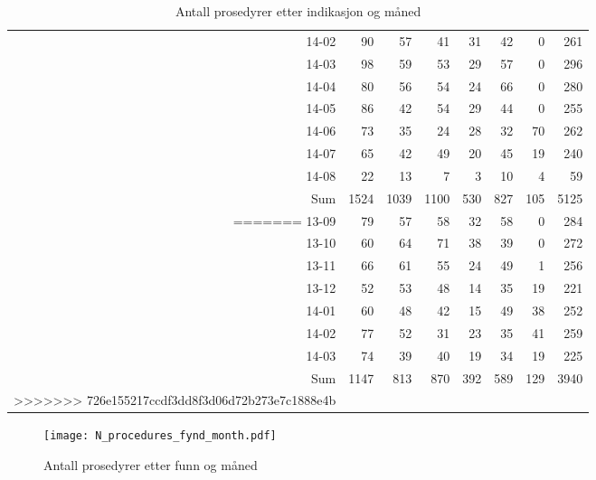 \documentclass[presentation,xcolor=pdftex,dvipsnames,table]{beamer}
\begin{document}
\begin{frame}
\begin{tiny}
\begin{table}[ht]
\begin{tabular}{rrrrrrrr}
  14-02 & 90 & 57 & 41 & 31 & 42 & 0 & 261 \\ 
  14-03 & 98 & 59 & 53 & 29 & 57 & 0 & 296 \\ 
  14-04 & 80 & 56 & 54 & 24 & 66 & 0 & 280 \\ 
  14-05 & 86 & 42 & 54 & 29 & 44 & 0 & 255 \\ 
  14-06 & 73 & 35 & 24 & 28 & 32 & 70 & 262 \\ 
  14-07 & 65 & 42 & 49 & 20 & 45 & 19 & 240 \\ 
  14-08 & 22 & 13 & 7 & 3 & 10 & 4 & 59 \\ 
  Sum & 1524 & 1039 & 1100 & 530 & 827 & 105 & 5125 \\ 
=======
  13-09 & 79 & 57 & 58 & 32 & 58 & 0 & 284 \\ 
  13-10 & 60 & 64 & 71 & 38 & 39 & 0 & 272 \\ 
  13-11 & 66 & 61 & 55 & 24 & 49 & 1 & 256 \\ 
  13-12 & 52 & 53 & 48 & 14 & 35 & 19 & 221 \\ 
  14-01 & 60 & 48 & 42 & 15 & 49 & 38 & 252 \\ 
  14-02 & 77 & 52 & 31 & 23 & 35 & 41 & 259 \\ 
  14-03 & 74 & 39 & 40 & 19 & 34 & 19 & 225 \\ 
  Sum & 1147 & 813 & 870 & 392 & 589 & 129 & 3940 \\ 
>>>>>>> 726e155217ccdf3dd8f3d06d72b273e7c1888e4b
   \bottomrule
\end{tabular}
\caption{Antall prosedyrer etter indikasjon og måned} 
\end{table}\end{tiny}
\end{frame}




\begin{frame}
\begin{figure}
  \centering
  \caption{Antall prosedyrer etter funn og måned}
\texttt{[image: N\_procedures\_fynd\_month.pdf]}
\end{figure}\end{frame}
\end{document}
